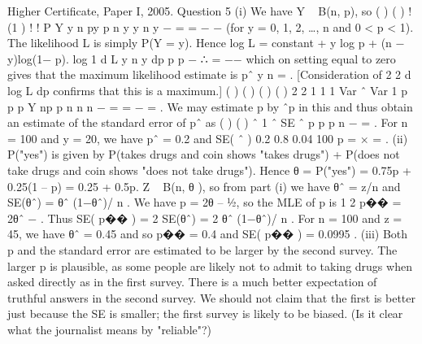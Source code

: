 \documentclass[a4paper,12pt]{article}
\begin{document}
Higher Certificate, Paper I, 2005. Question 5
(i) We have Y ~ B(n, p), so ( ) ( ) ! (1 )
! !
P Y y n py p n y
y n y
− = = −
−
(for y = 0, 1, 2, …, n
and 0 < p < 1). The likelihood L is simply P(Y = y).
Hence log L = constant + y log p + (n − y)log(1− p).
log
1
d L y n y
dp p p
− ∴ = −−
which on setting equal to zero gives that the maximum
likelihood estimate is pˆ y
n
= . [Consideration of
2
2
d log L
dp
confirms that this is a
maximum.]
( ) ( ) ( ) ( )
2 2
1 1 1 Var ˆ Var 1
p p
p Y np p
n n n
−
= = − = . We may estimate p by ˆp in this and
thus obtain an estimate of the standard error of pˆ as ( ) ( ) ˆ 1 ˆ
SE ˆ
p p
p
n
−
= .
For n = 100 and y = 20, we have pˆ = 0.2 and SE( ˆ ) 0.2 0.8 0.04
100
p = × = .
(ii) P("yes") is given by P(takes drugs and coin shows "takes drugs") + P(does not
take drugs and coin shows "does not take drugs").
Hence θ = P("yes") = 0.75p + 0.25(1 – p) = 0.25 + 0.5p.
Z ~ B(n, θ ), so from part (i) we have θˆ = z/n and SE(θˆ) = θˆ (1−θˆ)/ n .
We have p = 2θ – ½, so the MLE of p is 1
2
p�� = 2θˆ − .
Thus SE( p�� ) = 2 SE(θˆ) = 2 θˆ (1−θˆ)/ n .
For n = 100 and z = 45, we have θˆ = 0.45 and so p�� = 0.4 and SE( p�� ) = 0.0995 .
(iii) Both p and the standard error are estimated to be larger by the second survey.
The larger p is plausible, as some people are likely not to admit to taking drugs when
asked directly as in the first survey. There is a much better expectation of truthful
answers in the second survey. We should not claim that the first is better just because
the SE is smaller; the first survey is likely to be biased. (Is it clear what the journalist
means by "reliable"?)
\end{document}
